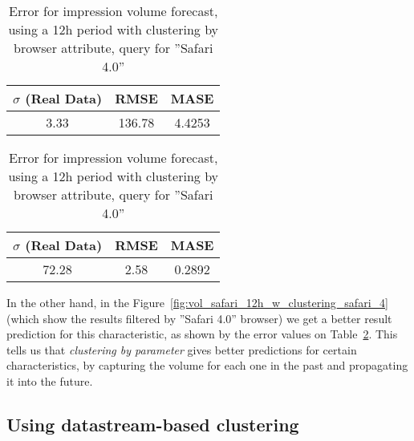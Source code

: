 \begin{table}[!ht]
\centering
\footnotesize
\begin{minipage}[t]{0.45\linewidth}
\centering

\footnotesize
\begin{tabular}{ccc}
 $\sigma$ (Real Data) & RMSE & MASE   \\ \hline
3.33 & 136.78 & 4.4253 \\
\end{tabular}

\vspace{0.5cm}

\caption[Volume
impression forecast error, safari, clustering by browser]{Error for impression volume
forecast, using a 12h period with clustering by browser attribute}
\label{tab:err_forecast_12_safari_w_clustering}
\end{minipage}
\quad
\begin{minipage}[t]{0.45\linewidth}
\centering
\footnotesize
\begin{tabular}{ccc}
 $\sigma$ (Real Data) & RMSE & MASE   \\ \hline
72.28 & 2.58 & 0.2892 \\
\end{tabular}

\vspace{0.5cm}

\caption[Volume
impression forecast error, safari, clustering by browser, filtered]{Error for impression volume
forecast, using a 12h period with clustering by browser attribute, query for ''Safari 4.0''}
\label{tab:err_forecast_12_safari_w_clustering_safari_4}

\end{minipage}

\end{table}

In the other hand, in the
Figure~\ref{fig:vol_safari_12h_w_clustering_safari_4}(which show the results
filtered by ''Safari 4.0'' browser) we get a better result prediction for this
characteristic, as shown by the error values on
Table~\ref{tab:err_forecast_12_safari_w_clustering_safari_4}.
This tells us that \emph{clustering by parameter} gives better predictions for certain
characteristics, by capturing the volume for each one in the past and
propagating it into the future.

\subsection*{Using datastream-based clustering}

